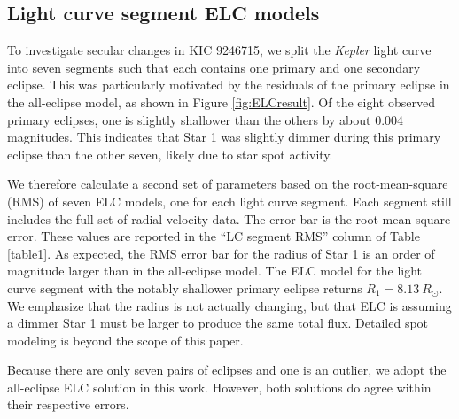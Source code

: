 \subsection{Light curve segment ELC models}
To investigate secular changes in KIC 9246715, we split the \emph{Kepler} light curve into seven segments such that each contains one primary and one secondary eclipse. This was particularly motivated by the residuals of the primary eclipse in the all-eclipse model, as shown in Figure \ref{fig:ELCresult}. Of the eight observed primary eclipses, one is slightly shallower than the others by about 0.004 magnitudes. This indicates that Star 1 was slightly dimmer during this primary eclipse than the other seven, likely due to star spot activity.

We therefore calculate a second set of parameters based on the root-mean-square (RMS) of seven ELC models, one for each light curve segment. Each segment still includes the full set of radial velocity data. The error bar is the root-mean-square error. These values are reported in the ``LC segment RMS'' column of Table \ref{table1}. As expected, the RMS error bar for the radius of Star 1 is an order of magnitude larger than in the all-eclipse model. The ELC model for the light curve segment with the notably shallower primary eclipse returns $R_1 = 8.13 \ R_{\odot}$. We emphasize that the radius is not actually changing, but that ELC is assuming a dimmer Star 1 must be larger to produce the same total flux. Detailed spot modeling is beyond the scope of this paper.

Because there are only seven pairs of eclipses and one is an outlier, we adopt the all-eclipse ELC solution in this work. However, both solutions do agree within their respective errors.